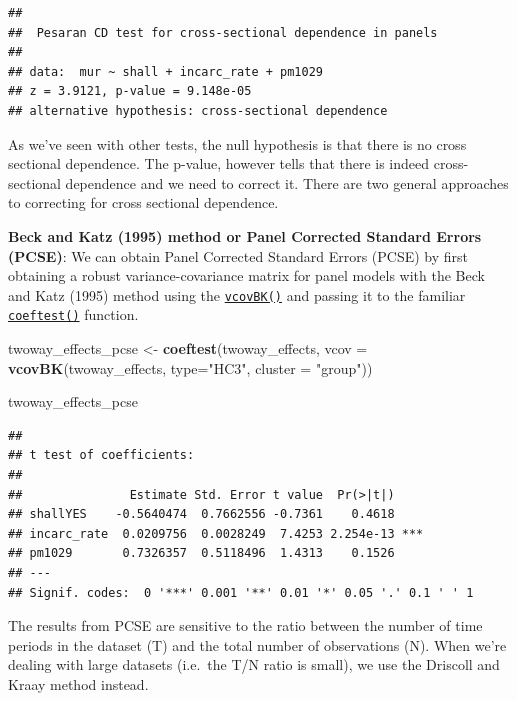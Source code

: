 \documentclass[]{article}
\newenvironment{Shaded}{\begin{snugshade}}{\end{snugshade}}
\newcommand{\KeywordTok}[1]{\textcolor[rgb]{0.13,0.29,0.53}{\textbf{{#1}}}}
\newcommand{\DataTypeTok}[1]{\textcolor[rgb]{0.13,0.29,0.53}{{#1}}}
\newcommand{\StringTok}[1]{\textcolor[rgb]{0.31,0.60,0.02}{{#1}}}
\newcommand{\NormalTok}[1]{{#1}}
\theoremstyle{definition}
\theoremstyle{definition}
\theoremstyle{remark}
\begin{document}
\begin{verbatim}
## 
##  Pesaran CD test for cross-sectional dependence in panels
## 
## data:  mur ~ shall + incarc_rate + pm1029
## z = 3.9121, p-value = 9.148e-05
## alternative hypothesis: cross-sectional dependence
\end{verbatim}

As we've seen with other tests, the null hypothesis is that there is no
cross sectional dependence. The p-value, however tells that there is
indeed cross-sectional dependence and we need to correct it. There are
two general approaches to correcting for cross sectional dependence.

\textbf{Beck and Katz (1995) method or Panel Corrected Standard Errors
(PCSE)}: We can obtain Panel Corrected Standard Errors (PCSE) by first
obtaining a robust variance-covariance matrix for panel models with the
Beck and Katz (1995) method using the
\href{(http://bit.ly/r_vcovBK)}{\texttt{vcovBK()}} and passing it to the
familiar \href{http://bit.ly/r_coeftest}{\texttt{coeftest()}} function.

\begin{Shaded}
\begin{Highlighting}[]
\NormalTok{twoway_effects_pcse <-}\StringTok{ }\KeywordTok{coeftest}\NormalTok{(twoway_effects, }
                                \DataTypeTok{vcov =} \KeywordTok{vcovBK}\NormalTok{(twoway_effects, }
                                              \DataTypeTok{type=}\StringTok{"HC3"}\NormalTok{, }
                                              \DataTypeTok{cluster =} \StringTok{"group"}\NormalTok{)) }

\NormalTok{twoway_effects_pcse}
\end{Highlighting}
\end{Shaded}

\begin{verbatim}
## 
## t test of coefficients:
## 
##               Estimate Std. Error t value  Pr(>|t|)    
## shallYES    -0.5640474  0.7662556 -0.7361    0.4618    
## incarc_rate  0.0209756  0.0028249  7.4253 2.254e-13 ***
## pm1029       0.7326357  0.5118496  1.4313    0.1526    
## ---
## Signif. codes:  0 '***' 0.001 '**' 0.01 '*' 0.05 '.' 0.1 ' ' 1
\end{verbatim}

The results from PCSE are sensitive to the ratio between the number of
time periods in the dataset (T) and the total number of observations
(N). When we're dealing with large datasets (i.e.~the T/N ratio is
small), we use the Driscoll and Kraay method instead.
\end{document}
